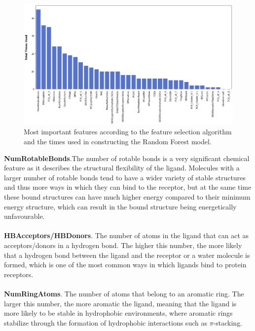 \begin{figure}[h]
    \centering
    \includegraphics[width=\textwidth]{Images/Appendix/Features.png}
    \caption{Most important features according to the feature selection algorithm and the times used in constructing the Random Forest model.}
\end{figure}
\textbullet\hspace{0.5cm}\textbf{NumRotableBonds}.The number of rotable bonds is a very significant chemical feature as it describes the structural flexibility of the ligand. Molecules with a larger number of rotable bonds tend to have a wider variety of stable structures and thus more ways in which they can bind to the receptor, but at the same time these bound structures can have much higher energy compared to their minimum energy structure, which can result in the bound structure being energetically unfavourable.\\\\
\textbullet\hspace{0.5cm}\textbf{HBAcceptors/HBDonors}. The number of atoms in the ligand that can act as acceptors/donors in a hydrogen bond. The higher this number, the more likely that a hydrogen bond between the ligand and the receptor or a water molecule is formed, which is one of the most common ways in which ligands bind to protein receptors.\\\\
\textbullet\hspace{0.5cm}\textbf{NumRingAtoms}. The number of atoms that belong to an aromatic ring. The larger this number, the more aromatic the ligand, meaning that the ligand is more likely to be stable in hydrophobic environments, where aromatic rings stabilize through the formation of hydrophobic interactions such as $\pi$-stacking.\\\\
